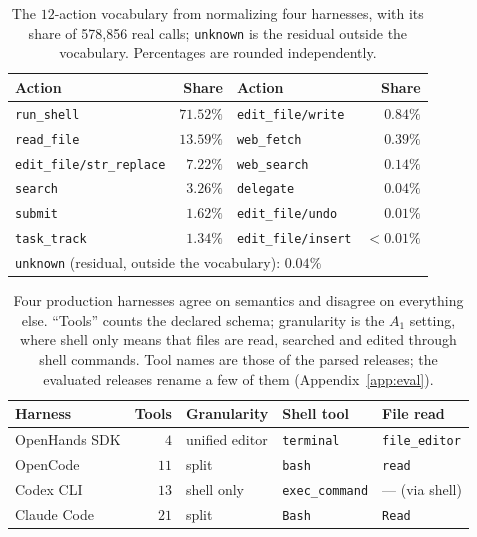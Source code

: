 \documentclass{article} %
\newcommand{\claudecode}{Claude Code}
\newcommand{\opencode}{OpenCode}
\newcommand{\codexcli}{Codex CLI}
\newcommand{\openhands}{OpenHands SDK}   %
\newcommand{\numactions}{578{,}856}       %
\begin{document}
\begin{table}[b]
\caption{The $12$-action vocabulary from normalizing four harnesses, with its
share of \numactions{} real calls; \texttt{unknown} is the
residual outside the vocabulary. Percentages are rounded independently.}
\label{tab:vocab}
\begin{center}
\begin{small}
\begin{tabular}{lrlr}
\toprule
Action & Share & Action & Share \\
\midrule
\texttt{run\_shell}              & $71.52\%$ & \texttt{edit\_file/write}  & $0.84\%$ \\
\texttt{read\_file}              & $13.59\%$ & \texttt{web\_fetch}        & $0.39\%$ \\
\texttt{edit\_file/str\_replace} & $7.22\%$  & \texttt{web\_search}       & $0.14\%$ \\
\texttt{search}                  & $3.26\%$  & \texttt{delegate}          & $0.04\%$ \\
\texttt{submit}                  & $1.62\%$  & \texttt{edit\_file/undo}   & $0.01\%$ \\
\texttt{task\_track}             & $1.34\%$  & \texttt{edit\_file/insert} & $<0.01\%$ \\
\midrule
\multicolumn{4}{l}{\texttt{unknown} (residual, outside the vocabulary): $0.04\%$}\\
\bottomrule
\end{tabular}
\end{small}
\end{center}
\end{table}

\begin{table}[t]
\caption{Four production harnesses agree on semantics and disagree on
everything else. ``Tools'' counts the declared schema; granularity is the
$A_1$ setting, where shell only means that files are read, searched and edited
through shell commands. Tool names are those of the parsed releases; the
evaluated releases rename a few of them (Appendix~\ref{app:eval}).}
\label{tab:harnesses}
\begin{center}
\begin{small}
\begin{tabular}{lrlll}
\toprule
Harness & Tools & Granularity & Shell tool & File read \\
\midrule
\openhands{}     & $4$  & unified editor & \texttt{terminal}      & \texttt{file\_editor} \\
\opencode{}      & $11$ & split          & \texttt{bash}          & \texttt{read} \\
\codexcli{}     & $13$ & shell only     & \texttt{exec\_command} & --- (via shell) \\
\claudecode{}   & $21$ & split          & \texttt{Bash}          & \texttt{Read} \\
\bottomrule
\end{tabular}
\end{small}
\end{center}
\end{table}
\end{document}
